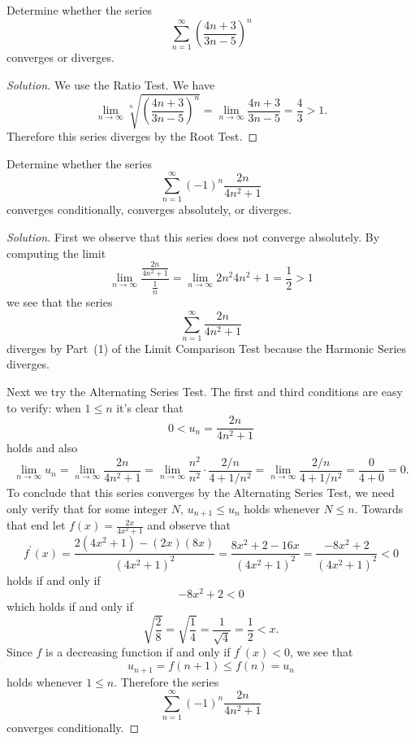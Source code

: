 \documentclass[12pt]{amsart}
\begin{document}
\begin{thm}[15 Points]
  Determine whether the series
  \[\sum_{n = 1}^\infty \left(\frac{4n+3}{3n-5}\right)^n\]
  converges or diverges.
\end{thm}

\begin{proof}[Solution]
  We use the Ratio Test.
  We have
  \[\lim_{n \to \infty} \sqrt[n]{\left(\frac{4n+3}{3n-5}\right)^n} = \lim_{n \to \infty} \frac{4n + 3}{3n - 5} = \frac{4}{3} > 1.\]
  Therefore this series diverges by the Root Test.
\end{proof}

\begin{thm}[15 Points]
  Determine whether the series
  \[\sum_{n = 1}^\infty (-1)^n\frac{2n}{4n^2 + 1}\]
  converges conditionally, converges absolutely, or diverges.
\end{thm}

\begin{proof}[Solution]
  First we observe that this series does not converge absolutely.
  By computing the limit
  \[\lim_{n \to \infty} \frac{\frac{2n}{4n^2 + 1}}{\frac{1}{n}} = \lim_{n \to \infty} {2n^2}{4n^2 + 1} = \frac{1}{2} > 1\]
  we see that the series
  \[\sum_{n = 1}^\infty \frac{2n}{4n^2 + 1}\]
  diverges by Part~(1) of the Limit Comparison Test because the Harmonic Series diverges.

  Next we try the Alternating Series Test.
  The first and third conditions are easy to verify: when \(1 \leq n\) it's clear that
  \[0 < u_n = \frac{2n}{4n^2 + 1}\]
  holds and also
  \[\lim_{n \to \infty} u_n = \lim_{n \to \infty} \frac{2n}{4n^2 + 1} = \lim_{n \to \infty} \frac{n^2}{n^2} \cdot \frac{2/n}{4 + 1/n^2} = \lim_{n \to \infty} \frac{2/n}{4 + 1/n^2} = \frac{0}{4 + 0} = 0.\]
  To conclude that this series converges by the Alternating Series Test, we need only verify that for some integer \(N\), \(u_{n + 1} \leq u_n\) holds whenever \(N \leq n\).
  Towards that end let \(f(x) = \frac{2x}{4x^2 + 1}\) and observe that
  \[f^\prime(x) = \frac{2(4x^2 + 1) - (2x)(8x)}{(4x^2 + 1)^2} = \frac{8x^2 + 2 - 16x}{(4x^2 + 1)^2} = \frac{-8x^2 + 2}{(4x^2 + 1)^2} < 0\]
  holds if and only if
  \[-8x^2 +2 < 0\]
  which holds if and only if
  \[\sqrt{\frac{2}{8}} = \sqrt{\frac{1}{4}} = \frac{1}{\sqrt{4}} = \frac{1}{2} < x.\]
  Since \(f\) is a decreasing function if and only if \(f^\prime(x) < 0\), we see that
  \[u_{n + 1} = f(n + 1) \leq f(n) = u_n\]
  holds whenever \(1 \leq n\).
  Therefore the series
  \[\sum_{n = 1}^\infty (-1)^n\frac{2n}{4n^2 + 1}\]
  converges conditionally.
\end{proof}
\end{document}
